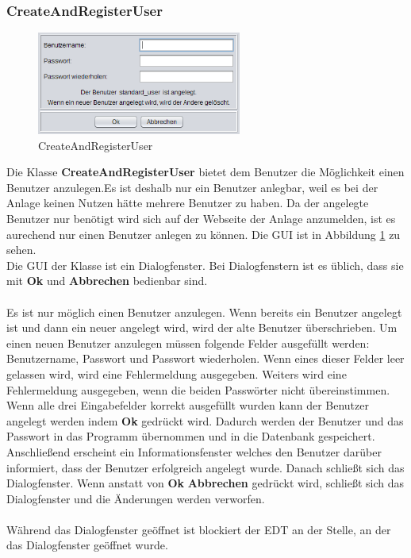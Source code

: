 \subsubsection{CreateAndRegisterUser}
\begin{figure}
\vspace{-20pt}
  \begin{center}
    \includegraphics[width=0.60\textwidth]{Bilder/GUI/CreateUser}
  \end{center}
  \caption{CreateAndRegisterUser}
  \label{CreateAndRegisterUser}
  \vspace{-10pt}
\end{figure}
Die Klasse \textbf{CreateAndRegisterUser} bietet dem Benutzer die Möglichkeit einen Benutzer anzulegen.Es ist deshalb nur ein Benutzer anlegbar, weil es bei der Anlage keinen Nutzen hätte mehrere Benutzer zu haben. Da der angelegte Benutzer nur benötigt wird sich auf der Webseite der Anlage anzumelden, ist es aurechend nur einen Benutzer anlegen zu können. Die GUI ist in Abbildung \ref{CreateAndRegisterUser} zu sehen.
\\ Die GUI der Klasse ist ein Dialogfenster. Bei Dialogfenstern ist es üblich, dass sie mit \textbf{Ok} und \textbf{Abbrechen} bedienbar sind.
\\ \\ Es ist nur möglich einen Benutzer anzulegen. Wenn bereits ein Benutzer angelegt ist und dann ein neuer angelegt wird, wird der alte Benutzer überschrieben. Um einen neuen Benutzer anzulegen müssen folgende Felder ausgefüllt werden: Benutzername, Passwort und Passwort wiederholen. Wenn eines dieser Felder leer gelassen wird, wird eine Fehlermeldung ausgegeben. Weiters wird eine Fehlermeldung ausgegeben, wenn die beiden Passwörter nicht übereinstimmen. Wenn alle drei Eingabefelder korrekt ausgefüllt wurden kann der Benutzer angelegt werden indem \textbf{Ok} gedrückt wird. Dadurch werden der Benutzer und das Passwort in das Programm übernommen und in die Datenbank gespeichert. Anschließend erscheint ein Informationsfenster welches den Benutzer darüber informiert, dass der Benutzer erfolgreich angelegt wurde. Danach schließt sich das Dialogfenster. Wenn anstatt von \textbf{Ok} \textbf{Abbrechen} gedrückt wird, schließt sich das Dialogfenster und die Änderungen werden verworfen.
\\ \\ Während das Dialogfenster geöffnet ist blockiert der EDT an der Stelle, an der das Dialogfenster geöffnet wurde.

